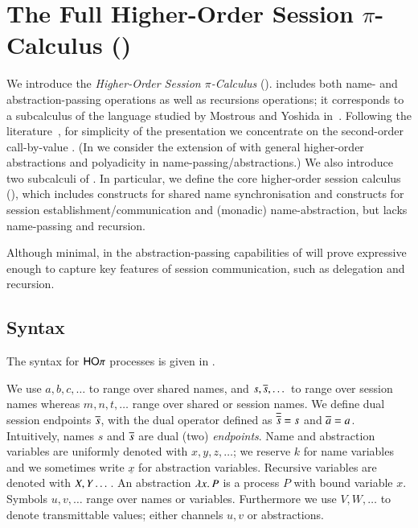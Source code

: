 
\section{The Full Higher-Order Session $\pi$-Calculus (\HOp)}
\label{sec:calculus}

We introduce the 
\emph{Higher-Order Session $\pi$-Calculus} (\HOp).
\HOp includes both name- and abstraction-passing operations
as well as recursions operations; it corresponds to a subcalculus 
of the language
studied by Mostrous and Yoshida
in~\cite{tlca07}. 
Following the literature~\cite{DBLP:journals/lmcs/JeffreyR05},
for simplicity of the presentation
we concentrate on the second-order call-by-value \HOp.  
(In  we consider the extension of 
\HOp with general higher-order abstractions 
and polyadicity in name-passing/abstractions.)
We also introduce two subcalculi of \HOp.
In particular, we define the 
core higher-order session
calculus (\HO), which 
includes constructs for shared name synchronisation and 
constructs for session establish\-ment/communication and 
(monadic) name-abstraction, but lacks name-passing and recursion.

Although minimal, in 
the abstraction-passing capabilities of \HOp will prove 
expressive enough to capture key features of session communication, 
such as delegation and recursion.

\subsection{Syntax} 

The syntax for $\mathsf{HO}\pi$ processes is given in .

We use $a,b,c, \dots$ to range over shared names, and
$s, \overline{s}, \dots$ to range over session names
whereas $m, n, t, \dots$ range over shared or session names.
We define dual session endpoints $\overline{s}$,
with the dual operator defined as
$\overline{\overline{s}} = s$ and $\overline{a} = a$.
Intuitively, names $s$ and $\overline{s}$ are dual (two) \emph{endpoints}.
Name and abstraction variables are uniformly denoted with $x, y, z, \dots$;
we reserve $k$ for name variables and we sometimes write $\underline{x}$ for abstraction variables.
Recursive variables are denoted with $X, Y \dots$.
An abstraction $\lambda x.\,P$ is a process $P$ with bound variable $x$.
Symbols $u, v, \dots$ range over names or variables. Furthermore
we use $V, W, \dots$ to denote transmittable values; either channels $u, v$ or
abstractions.

